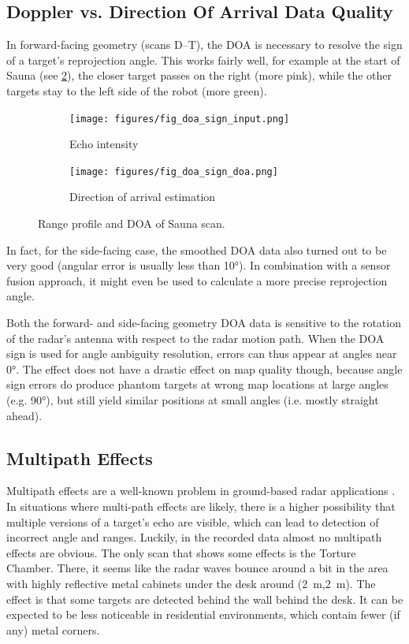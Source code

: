 \subsection{Doppler vs. Direction Of Arrival Data Quality} \label{doppler-vs-direction-of-arrival-data-quality}
In forward-facing geometry (scans D--T), the DOA is necessary to resolve
the sign of a target's reprojection angle. This works fairly well, for
example at the start of Sauna (see \cref{fig:sauna_doa}), the closer target
passes on the right (more pink), while the other targets stay to the
left side of the robot (more green).

\begin{figure}[htbp]
    \centering
    \begin{subfigure}[b]{0.45\textwidth}
        \texttt{[image: figures/fig\_doa\_sign\_input.png]}
        \caption{\label{fig:sauna_input}Echo intensity}
    \end{subfigure}%
    \hfill%
    \begin{subfigure}[b]{0.45\textwidth}
        \texttt{[image: figures/fig\_doa\_sign\_doa.png]}
        \caption{\label{fig:sauna_doa}Direction of arrival estimation}
    \end{subfigure}
    \caption{Range profile and DOA of Sauna scan.}
    \label{fig:sauna}
\end{figure}

In fact, for the side-facing case, the smoothed DOA data also turned out
to be very good (angular error is usually less than \ang{10}). In combination with a sensor fusion approach, it might even be used to calculate a more precise
reprojection angle.

Both the forward- and side-facing geometry DOA data is sensitive to the rotation of the radar's antenna with respect to the radar motion path. When the DOA sign is used for angle ambiguity resolution, errors can thus appear at angles near \ang{0}. The effect does not have a drastic effect on map quality though, because angle sign errors do produce phantom targets at wrong map locations at large angles (e.g. \ang{90}), but still yield similar positions at small angles (i.e. mostly straight ahead).


\subsection{Multipath Effects}\label{multipath-effects}
Multipath effects are a well-known problem in ground-based radar
applications \cite{Adams2012}. In situations where multi-path effects
are likely, there is a higher possibility that multiple versions of a
target's echo are visible, which can lead to detection of incorrect
angle and ranges. Luckily, in the recorded data almost no multipath
effects are obvious. The only scan that shows some effects is the
Torture Chamber. There, it seems like the radar waves bounce around a
bit in the area with highly reflective metal cabinets under the desk around (\SI{2}{m},\SI{2}{m}). The effect is that some targets are detected behind the wall behind the desk. It can be expected to be less noticeable in residential environments, which contain fewer (if any) metal corners.


